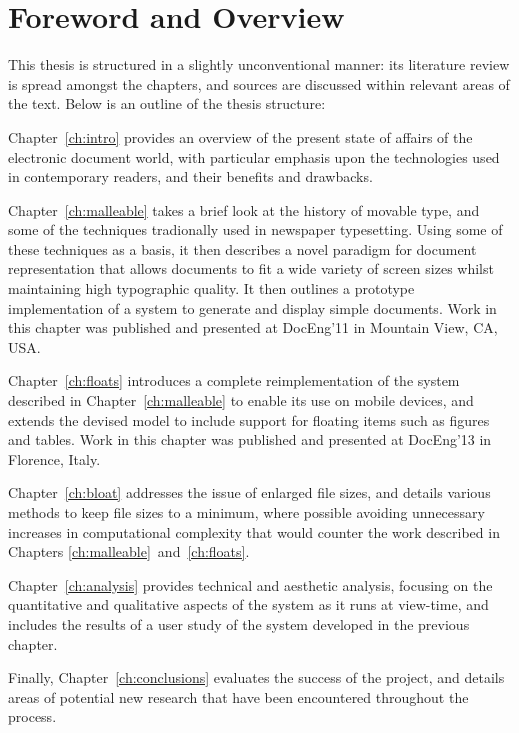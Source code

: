 \chapter{Foreword and Overview}
This thesis is structured in a slightly unconventional manner: its literature review is spread amongst the chapters, and sources are discussed within relevant areas of the text. Below is an outline of the thesis structure:

\vspace{1em}
\noindent Chapter~\ref{ch:intro} provides an overview of the present state of affairs of the electronic document world, with particular emphasis upon the technologies used in contemporary \ebook{} readers, and their benefits and drawbacks.

\vspace{1em}
\noindent Chapter~\ref{ch:malleable} takes a brief look at the history of movable type, and some of the techniques tradionally used in newspaper typesetting. Using some of these techniques as a basis, it then describes a novel paradigm for document representation that allows documents to fit a wide variety of screen sizes whilst maintaining high typographic quality. It then outlines a prototype implementation of a system to generate and display simple documents. Work in this chapter was published and presented at DocEng'11 in Mountain View, CA, USA.\hspace{0pt}\cite{Pinkney2011}

\vspace{1em}
\noindent Chapter~\ref{ch:floats} introduces a complete reimplementation of the system described in Chapter~\ref{ch:malleable} to enable its use on mobile devices, and extends the devised model to include support for floating items such as figures and tables. Work in this chapter was published and presented at DocEng'13 in Florence, Italy.\hspace{0pt}\cite{Pinkney2013}

\vspace{1em}
\noindent Chapter~\ref{ch:bloat} addresses the issue of enlarged file sizes, and details various methods to keep file sizes to a minimum, where possible avoiding unnecessary increases in computational complexity that would counter the work described in Chapters \ref{ch:malleable}~and~\ref{ch:floats}.

\vspace{1em}
\noindent Chapter~\ref{ch:analysis} provides technical and aesthetic analysis, focusing on the quantitative and qualitative aspects of the system as it runs at view-time, and includes the results of a user study of the system developed in the previous chapter.

\vspace{1em}
\noindent Finally, Chapter~\ref{ch:conclusions} evaluates the success of the project, and details areas of potential new research that have been encountered throughout the process.

